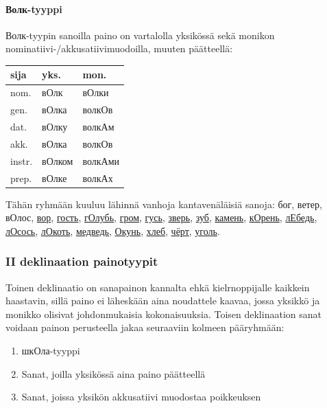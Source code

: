 \documentclass[]{scrartcl}
\providecommand{\tightlist}{%
  \setlength{\itemsep}{0pt}\setlength{\parskip}{0pt}}
\begin{document}
\paragraph{Волк-tyyppi}\label{ux432ux43eux43bux43a-tyyppi}

Волк-tyypin sanoilla paino on vartalolla yksikössä sekä monikon
nominatiivi-/akkusatiivimuodoilla, muuten päätteellä:

\begin{longtable}[c]{@{}lll@{}}
\toprule
sija & yks. & mon.\tabularnewline
\midrule
\endhead
nom. & вОлк & вОлки\tabularnewline
gen. & вОлка & волкОв\tabularnewline
dat. & вОлку & волкАм\tabularnewline
akk. & вОлка & волкОв\tabularnewline
instr. & вОлком & волкАми\tabularnewline
prep. & вОлке & волкАх\tabularnewline
\bottomrule
\end{longtable}

Tähän ryhmään kuuluu lähinnä vanhoja kantavenäläisiä sanoja: бог, ветер,
вОлос, \href{http://ru.wiktionary.org/wiki/вор}{вор},
\href{http://ru.wiktionary.org/wiki/гость}{гость},
\href{http://ru.wiktionary.org/wiki/голубь}{гОлубь},
\href{http://ru.wiktionary.org/wiki/гром}{гром},
\href{http://ru.wiktionary.org/wiki/гусь}{гусь},
\href{http://ru.wiktionary.org/wiki/зверь}{зверь},
\href{http://ru.wiktionary.org/wiki/зуб}{зуб},
\href{http://ru.wiktionary.org/wiki/камень}{камень},
\href{http://ru.wiktionary.org/wiki/корень}{кОрень},
\href{http://ru.wiktionary.org/wiki/лебедь}{лЕбедь},
\href{http://ru.wiktionary.org/wiki/лосось}{лОсось},
\href{http://ru.wiktionary.org/wiki/локоть}{лОкоть},
\href{http://ru.wiktionary.org/wiki/медведь}{медведь},
\href{http://ru.wiktionary.org/wiki/окунь}{Окунь},
\href{http://ru.wiktionary.org/wiki/хлеб}{хлеб},
\href{http://ru.wiktionary.org/wiki/чёрт}{чёрт},
\href{http://ru.wiktionary.org/wiki/уголь}{уголь}.

\subsubsection{II deklinaation
painotyypit}\label{ii-deklinaation-painotyypit}

Toinen deklinaatio on sanapainon kannalta ehkä kielrnoppijalle kaikkein
haastavin, sillä paino ei läheskään aina noudattele kaavaa, jossa
yksikkö ja monikko olisivat johdonmukaisia kokonaisuuksia. Toisen
deklinaation sanat voidaan painon perusteella jakaa seuraaviin kolmeen
pääryhmään:

\begin{enumerate}
\def\labelenumi{\arabic{enumi}.}
\tightlist
\item
  шкОла-tyyppi
\item
  Sanat, joilla yksikössä aina paino päätteellä
\item
  Sanat, joissa yksikön akkusatiivi muodostaa poikkeuksen
\end{enumerate}
\end{document}

